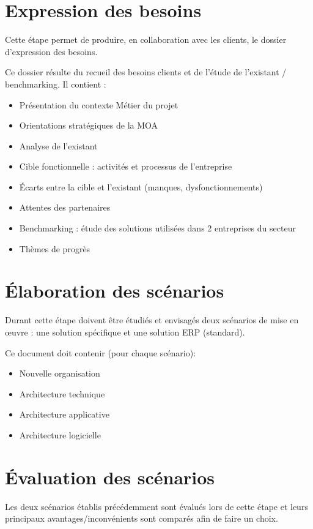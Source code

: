 	\section{Expression des besoins}

		Cette étape permet de produire, en collaboration avec les clients, le dossier d'expression des besoins.

		Ce dossier résulte du recueil des besoins clients et de l'étude de l'existant / benchmarking. Il contient :
		\begin{itemize}
		    \item Présentation du contexte Métier du projet
		    \item Orientations stratégiques de la MOA
		    \item Analyse de l’existant
		    \item Cible fonctionnelle : activités et processus de l’entreprise
		    \item Écarts entre la cible et l’existant (manques, dysfonctionnements)
		    \item Attentes des partenaires
		    \item Benchmarking : étude des solutions utilisées dans 2 entreprises du secteur
		    \item Thèmes de progrès
		\end{itemize}


	\section{Élaboration des scénarios}

		Durant cette étape doivent être étudiés et envisagés deux scénarios de mise en œuvre : une solution spécifique et une solution ERP (standard).

		Ce document doit contenir (pour chaque scénario):
		\begin{itemize}
		    \item Nouvelle organisation
		    \item Architecture technique
		    \item Architecture applicative
		    \item Architecture logicielle
		\end{itemize}


	\section{Évaluation des scénarios}

		Les deux scénarios établis précédemment sont évalués lors de cette étape et leurs principaux avantages/inconvénients sont comparés afin de faire un choix.

